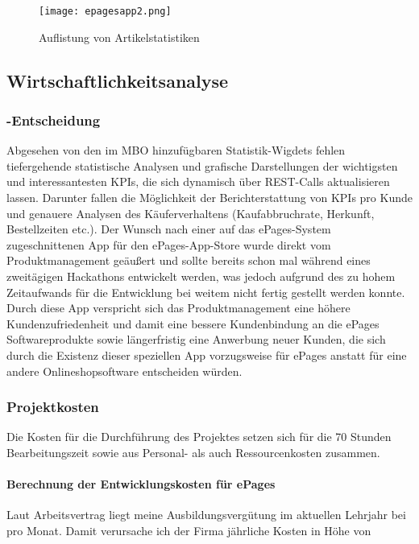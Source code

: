 \begin{figure}[htb]
\begin{center}
\texttt{[image: epagesapp2.png]}
\caption{Auflistung von Artikelstatistiken}
\label{fig:product}
\end{center}
\end{figure}
 
\subsection{Wirtschaftlichkeitsanalyse}
\label{sec:Wirtschaftlichkeitsanalyse}

\subsubsection{-Entscheidung}
\label{sec:MakeOrBuyEntscheidung}

Abgesehen von den im MBO hinzufügbaren Statistik-Wigdets
fehlen tiefergehende statistische Analysen und grafische Darstellungen der wichtigsten und interessantesten KPIs, die sich dynamisch über REST-Calls aktualisieren lassen. Darunter fallen die Möglichkeit der Berichterstattung von KPIs pro Kunde und genauere Analysen des Käuferverhaltens (Kaufabbruchrate, Herkunft, Bestellzeiten etc.). Der Wunsch nach einer auf das ePages-System zugeschnittenen App für den ePages-App-Store wurde direkt vom Produktmanagement geäußert und sollte bereits schon mal während eines zweitägigen Hackathons entwickelt werden, was jedoch aufgrund des zu hohem Zeitaufwands für die Entwicklung bei weitem nicht fertig gestellt werden konnte. Durch diese App verspricht sich das Produktmanagement eine höhere Kundenzufriedenheit und damit eine bessere Kundenbindung an die ePages Softwareprodukte sowie längerfristig eine Anwerbung neuer Kunden, die sich durch die Existenz dieser speziellen App vorzugsweise für ePages anstatt für eine andere Onlineshopsoftware entscheiden würden.
\subsubsection{Projektkosten}
\label{sec:Projektkosten}

Die Kosten für die Durchführung des Projektes setzen sich für die 70 Stunden Bearbeitungszeit sowie aus Personal- als auch Ressourcenkosten zusammen.

\paragraph{Berechnung der Entwicklungskosten für ePages}
Laut Arbeitsvertrag liegt meine Ausbildungsvergütung im aktuellen Lehrjahr bei  pro Monat. Damit verursache ich der Firma jährliche Kosten in Höhe von 

